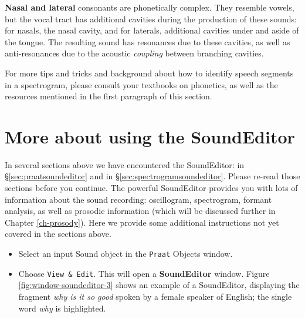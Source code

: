 \documentclass[
]{book}
\begin{document}
\textbf{Nasal and lateral} consonants are phonetically complex. They resemble vowels, but the vocal tract has additional cavities during the production of these sounds: for nasals, the nasal cavity, and for laterals, additional cavities under and aside of the tongue. The resulting sound has resonances due to these cavities, as well as anti-resonances due to the acoustic \emph{coupling} between branching cavities.

For more tips and tricks and background about how to identify speech segments in a spectrogram, please consult your textbooks on phonetics, as well as the resources mentioned in the first paragraph of this section.

\section{More about using the SoundEditor}\label{sec:soundeditor3}

In several sections above we have encountered the SoundEditor: in §\ref{sec:praatsoundeditor} and in §\ref{sec:spectrogramsoundeditor}. Please re-read those sections before you continue.
The powerful SoundEditor provides you with lots of information about the sound recording: oscillogram, spectrogram, formant analysis, as well as prosodic information (which will be discussed further in Chapter \ref{ch-prosody}).
Here we provide some additional instructions not yet covered in the sections above.

\label{box-soundeditor-3}
\begin{itemize}
\item
  Select an input Sound object in the \texttt{Praat} Objects window.
\item
  Choose \texttt{View\ \&\ Edit}.
  This will open a \textbf{SoundEditor} window.
  Figure \ref{fig:window-soundeditor-3} shows an example of a SoundEditor, displaying the fragment \emph{why is it so good} spoken by a female speaker of English; the single word \emph{why} is highlighted.
\end{itemize}
\end{document}
